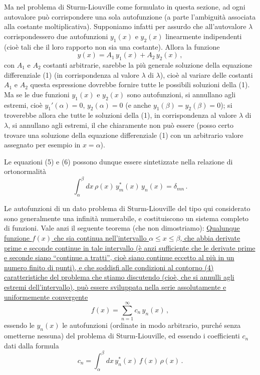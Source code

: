 \documentclass[11pt, a4paper]{book}
\numberwithin{equation}{section}
\begin{document}
Ma nel problema di Sturm-Liouville come formulato in questa sezione, ad ogni autovalore può corrispondere una sola autofunzione (a parte l'ambiguità associata alla costante moltiplicativa). Supponiamo infatti per assurdo che all'autovalore $\lambda$ corrispondessero due autofunzioni $y_1(x)$ e $y_2(x)$ linearmente indipendenti (cioè tali che il loro rapporto non sia una costante). Allora la funzione
\[
y(x)=A_1\,y_1(x)+A_2\,y_2(x)\,,
\]
con $A_1$ e $A_2$ costanti arbitrarie, sarebbe la più generale soluzione della equazione differenziale (1) (in corrispondenza al valore $\lambda$ di $\lambda$), cioè al variare delle costanti $A_1$ e $A_2$ questa espressione dovrebbe fornire tutte le possibili soluzioni della (1). Ma se le due funzioni $y_1(x)$ e $y_2(x)$ sono autofunzioni, si annullano agli estremi, cioè $y_1'(\alpha)=0$, $y_2(\alpha)=0$ (e anche $y_1(\beta)=y_2(\beta)=0$); si troverebbe allora che tutte le soluzioni della (1), in corrispondenza al valore $\lambda$ di $\lambda$, si annullano agli estremi, il che chiaramente non può essere (posso certo trovare una soluzione della equazione differenziale (1) con un arbitrario valore assegnato per esempio in $x=\alpha$).

Le equazioni (5) e (6) possono dunque essere sintetizzate nella relazione di ortonormalità
\begin{equation}
\int_\alpha^\beta dx\,\rho(x)\,y_m^*(x)\,y_n(x)=\delta_{mn}\,. \tag{7}
\end{equation}

Le autofunzioni di un dato problema di Sturm-Liouville del tipo qui considerato sono generalmente una infinità numerabile, e costituiscono un sistema completo di funzioni. Vale anzi il seguente teorema (che non dimostriamo): \underline{Qualunque funzione $f(x)$ che sia continua nell'intervallo $\alpha\leq x\leq\beta$, che abbia derivate prime e seconde continue in tale intervallo (è anzi sufficiente che le derivate prime e seconde siano ``continue a tratti'', cioè siano continue eccetto al più in un numero finito di punti), e che soddisfi alle condizioni al contorno (4) caratteristiche del problema che stiamo discutendo (cioè, che si annulli agli estremi dell'intervallo), può essere sviluppata nella serie assolutamente e uniformemente convergente}
\begin{equation}
f(x)=\sum_{n=1}^{\infty}c_n\,y_n(x)\,, \tag{8}
\end{equation}
essendo le $y_n(x)$ le autofunzioni (ordinate in modo arbitrario, purché senza ometterne nessuna) del problema di Sturm-Liouville, ed essendo i coefficienti $c_n$ dati dalla formula
\begin{equation}
c_n=\int_\alpha^\beta dx\,y_n^*(x)\,f(x)\,\rho(x)\,. \tag{9}
\end{equation}
\end{document}
